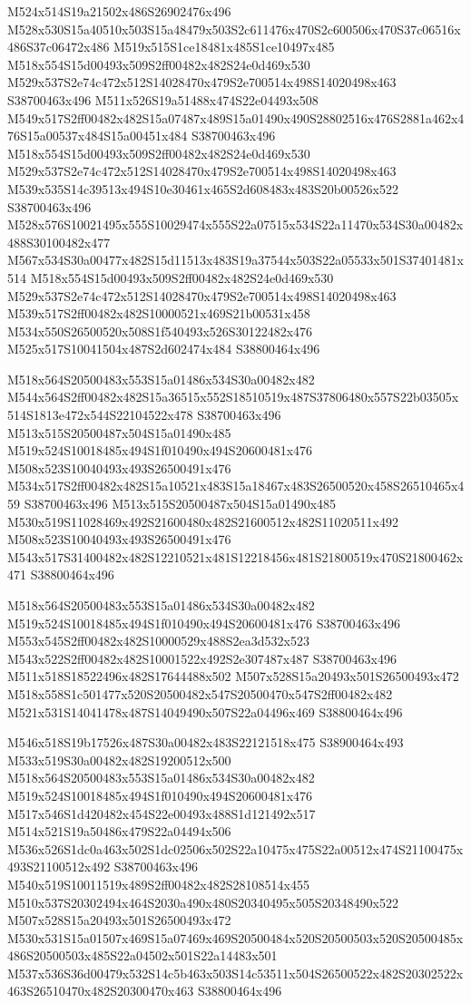 \documentclass{article}
\begin{document}
\begin{multicols}{2}
M524x514S19a21502x486S26902476x496 M528x530S15a40510x503S15a48479x503S2c611476x470S2c600506x470S37c06516x486S37c06472x486 M519x515S1ce18481x485S1ce10497x485 M518x554S15d00493x509S2ff00482x482S24e0d469x530 M529x537S2e74c472x512S14028470x479S2e700514x498S14020498x463 S38700463x496 M511x526S19a51488x474S22e04493x508 M549x517S2ff00482x482S15a07487x489S15a01490x490S28802516x476S2881a462x476S15a00537x484S15a00451x484 S38700463x496 M518x554S15d00493x509S2ff00482x482S24e0d469x530 M529x537S2e74c472x512S14028470x479S2e700514x498S14020498x463 M539x535S14c39513x494S10e30461x465S2d608483x483S20b00526x522 S38700463x496 M528x576S10021495x555S10029474x555S22a07515x534S22a11470x534S30a00482x488S30100482x477 M567x534S30a00477x482S15d11513x483S19a37544x503S22a05533x501S37401481x514 M518x554S15d00493x509S2ff00482x482S24e0d469x530 M529x537S2e74c472x512S14028470x479S2e700514x498S14020498x463 M539x517S2ff00482x482S10000521x469S21b00531x458 M534x550S26500520x508S1f540493x526S30122482x476 M525x517S10041504x487S2d602474x484 S38800464x496

M518x564S20500483x553S15a01486x534S30a00482x482 M544x564S2ff00482x482S15a36515x552S18510519x487S37806480x557S22b03505x514S1813e472x544S22104522x478 S38700463x496 M513x515S20500487x504S15a01490x485 M519x524S10018485x494S1f010490x494S20600481x476 M508x523S10040493x493S26500491x476 M534x517S2ff00482x482S15a10521x483S15a18467x483S26500520x458S26510465x459 S38700463x496 M513x515S20500487x504S15a01490x485 M530x519S11028469x492S21600480x482S21600512x482S11020511x492 M508x523S10040493x493S26500491x476 M543x517S31400482x482S12210521x481S12218456x481S21800519x470S21800462x471 S38800464x496

M518x564S20500483x553S15a01486x534S30a00482x482 M519x524S10018485x494S1f010490x494S20600481x476 S38700463x496 M553x545S2ff00482x482S10000529x488S2ea3d532x523 M543x522S2ff00482x482S10001522x492S2e307487x487 S38700463x496 M511x518S18522496x482S17644488x502 M507x528S15a20493x501S26500493x472 M518x558S1c501477x520S20500482x547S20500470x547S2ff00482x482 M521x531S14041478x487S14049490x507S22a04496x469 S38800464x496

M546x518S19b17526x487S30a00482x483S22121518x475 S38900464x493 M533x519S30a00482x482S19200512x500 M518x564S20500483x553S15a01486x534S30a00482x482 M519x524S10018485x494S1f010490x494S20600481x476 M517x546S1d420482x454S22e00493x488S1d121492x517 M514x521S19a50486x479S22a04494x506 M536x526S1dc0a463x502S1dc02506x502S22a10475x475S22a00512x474S21100475x493S21100512x492 S38700463x496 M540x519S10011519x489S2ff00482x482S28108514x455 M510x537S20302494x464S2030a490x480S20340495x505S20348490x522 M507x528S15a20493x501S26500493x472 M530x531S15a01507x469S15a07469x469S20500484x520S20500503x520S20500485x486S20500503x485S22a04502x501S22a14483x501 M537x536S36d00479x532S14c5b463x503S14c53511x504S26500522x482S20302522x463S26510470x482S20300470x463 S38800464x496


\end{multicols}
\end{document}
